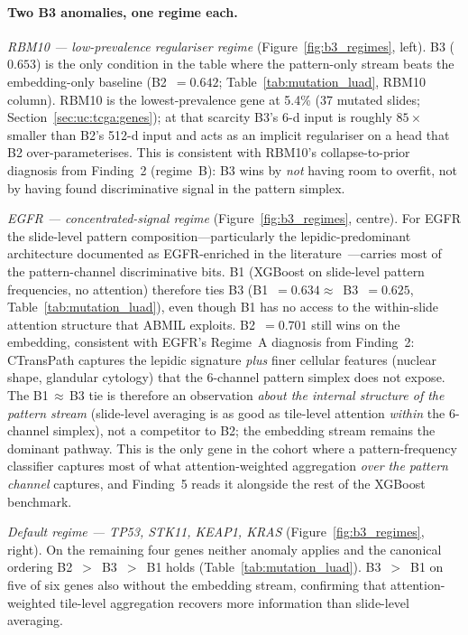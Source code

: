 \paragraph{Two B3 anomalies, one regime each.}

\emph{RBM10 --- low-prevalence regulariser regime}
(Figure~\ref{fig:b3_regimes}, left).
B3 ($0.653$) is the only condition in the table where the
pattern-only stream beats the embedding-only baseline
(B2~$= 0.642$; Table~\ref{tab:mutation_luad}, RBM10 column).
RBM10 is the lowest-prevalence gene at 5.4\% (37 mutated slides;
Section~\ref{sec:uc:tcga:genes}); at that scarcity B3's 6-d input
is roughly $85\times$ smaller than B2's 512-d input and acts as
an implicit regulariser on a head that B2 over-parameterises.
This is consistent with RBM10's collapse-to-prior diagnosis from
Finding~2 (regime~B): B3 wins by \emph{not} having room to
overfit, not by having found discriminative signal in the pattern
simplex.

\emph{EGFR --- concentrated-signal regime}
(Figure~\ref{fig:b3_regimes}, centre).
For EGFR the slide-level pattern composition---particularly the
lepidic-predominant architecture documented as EGFR-enriched in
the
literature~\cite{suda2017egfrlepidic,yoshizawa2011iaslcpattern}---carries
most of the pattern-channel discriminative bits.
B1 (XGBoost on slide-level pattern frequencies, no attention)
therefore ties B3 (B1~$= 0.634 \approx$~B3~$= 0.625$,
Table~\ref{tab:mutation_luad}), even though B1 has no access to
the within-slide attention structure that ABMIL exploits.
B2~$= 0.701$ still wins on the embedding, consistent with EGFR's
Regime~A diagnosis from Finding~2: CTransPath captures the lepidic
signature \emph{plus} finer cellular features (nuclear shape,
glandular cytology) that the 6-channel pattern simplex does not
expose.
The B1$\,\approx\,$B3 tie is therefore an observation \emph{about
the internal structure of the pattern stream} (slide-level
averaging is as good as tile-level attention \emph{within} the
6-channel simplex), not a competitor to B2; the embedding stream
remains the dominant pathway.
This is the only gene in the cohort where a pattern-frequency
classifier captures most of what attention-weighted aggregation
\emph{over the pattern channel} captures, and Finding~5 reads it
alongside the rest of the XGBoost benchmark.

\emph{Default regime --- TP53, STK11, KEAP1, KRAS}
(Figure~\ref{fig:b3_regimes}, right).
On the remaining four genes neither anomaly applies and the
canonical ordering B2~$>$~B3~$>$~B1 holds
(Table~\ref{tab:mutation_luad}).
B3~$>$~B1 on five of six genes also without the embedding stream,
confirming that attention-weighted tile-level aggregation recovers
more information than slide-level averaging.

